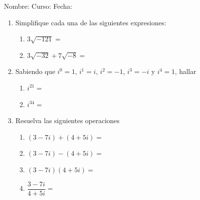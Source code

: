 \documentclass[fleqn]{article}
\newcommand{\LineaNombre}{%
\par
\vspace{\baselineskip}
Nombre:\hrulefill \; Curso: \underline{\hspace*{30pt}} \; Fecha: \underline{\hspace*{2.5cm}} \relax
\par}
\begin{document}
\LineaNombre
\begin{enumerate}
 \item Simplifique cada una de las siguientes expresiones:
 \begin{enumerate}
 \item $3\sqrt{-121}=$\noanswer
 \item $3\sqrt{-32}+7\sqrt{-8}=$ \noanswer
 \end{enumerate}
 \item Sabiendo que $i^{0}=1$, $i^{1}=i$, $i^{2}=-1$, $i^{3}=-i$ y $i^{4}=1$, hallar
 \begin{enumerate}
 \item $i^{21}=$\noanswer
 \item $i^{34}=$\noanswer
 \end{enumerate}
 \newpage
 \item Resuelva las siguientes operaciones
 \begin{enumerate}
 \item $(3-7i)+(4+5i)=$ \noanswer
 \item $(3-7i)-(4+5i)=$ \noanswer
 \item $(3-7i)(4+5i)=$ \noanswer
 \item $\dfrac{3-7i}{4+5i}=$ \noanswer
 \end{enumerate}
 \end{enumerate}
\end{document}
